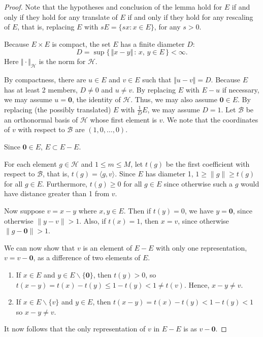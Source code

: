 \documentclass[letter,11pt]{amsart}
\numberwithin{theorem}{section}
\theoremstyle{remark}
\numberwithin{equation}{section}
\newcommand\setof[2]{\{\,{#1}\,:\, {#2}\,\}}
\begin{document}
\begin{proof}
Note that the hypotheses and conclusion of the lemma hold for $E$ if and only if they hold for any translate of $E$ if and only if they hold for any rescaling of $E$, that is, replacing $E$ 
with $sE=\{sx:x\in E\}$, for any $s>0$.

 Because $E \times E$ is compact, the set $E$ has a finite diameter $D$:
$$
D=\sup\setof{\Vert x-y\Vert}{x, \, y \in E}<\infty.
$$
Here $\Vert\cdot\Vert_{\mathcal H}$ is the norm for $\mathcal H$.


By compactness, there are $u \in E$ and $v \in E$ such that $\Vert u-v \Vert=D$.  
Because $E$ has at least 2 members, $D \ne 0$ and $u \ne v$. 
 By replacing $E$ with $E-u$ if necessary, we may assume $u=\mathbf 0$, the identity
 of $\mathcal H$. 
 Thus, we may also assume $\mathbf 0\in E$.
  By replacing (the possibly translated) $E$ with $\frac 1 D E$,
we may assume $D=1$. Let $\mathcal B$ be an 
orthonormal basis of $\mathcal H$ whose first element is $v$.  We note that
the coordinates of $v$ with respect to $\mathcal B$ are $(1,0,\dots,0)$.

Since $\mathbf 0\in E$, $E\subset E-E$.


For each element $g\in\mathcal H$ and $1\le m\le M$,  let $t(g)$ 
be the first coefficient with respect to $\mathcal B$, that
is, $t(g)= \langle g,v\rangle.$
Since $E$ has diameter 1, $1\ge \|g\|\ge t(g)$ 
for all $g\in E$. Furthermore, $t(g)\ge 0$ for all $g\in E$
since otherwise such a $g$ would have distance greater than 1 from $v$.

Now suppose $v=x-y$ where $x,y\in E.$
Then if $t(y) = 0$, we have $y={\mathbf 0}$, since otherwise $\|y-v\|>1$.
Also, if $t(x) = 1$, then $x=v$, since otherwise $\|g-\mathbf 0\|>1$.

We can now show that $v$ is an element of $E-E$ with only one
representation, $v= v-\mathbf 0$, as   a difference of two elements of $E$.


 

\begin{enumerate}
\item If $x\in E$ and $y\in E\backslash\{{\mathbf{ 0}}\}$, 
then $t(y)>0$, so
$t(x-y) = t(x) -t(y)\le 1-t(y)<1\ne t(v)$. 
Hence, $x-y\ne v$.
\item  If $x\in E\backslash \{v\}$ and $y\in E$, 
then $t(x-y)= t(x) -t(y) <1-t(y)<1$ so $x-y \ne v$.
\end{enumerate}
It now follows that the only representation of $v$ in $E-E$ is as
$v-\mathbf 0$.
\end{proof}
\end{document}
